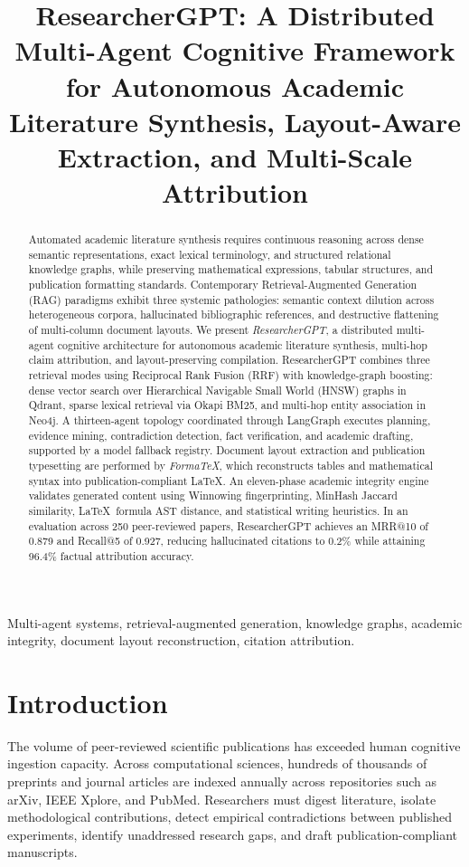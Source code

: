 \documentclass[conference]{IEEEtran}
\title{ResearcherGPT: A Distributed Multi-Agent Cognitive Framework for Autonomous Academic Literature Synthesis, Layout-Aware Extraction, and Multi-Scale Attribution}
\author{
\IEEEauthorblockN{Archit Gupta}
\IEEEauthorblockA{\textit{Department of Artificial Intelligence and Data Science} \\
\textit{Independent Researcher} \\
architag1503@gmail.com}
\and
\IEEEauthorblockN{Tanishq Sharma}
\IEEEauthorblockA{\textit{Department of Artificial Intelligence and Data Science} \\
\textit{Independent Researcher} \\
tanishq2228@gmail.com}
}
\begin{document}
\maketitle

\begin{abstract}
Automated academic literature synthesis requires continuous reasoning across dense semantic representations, exact lexical terminology, and structured relational knowledge graphs, while preserving mathematical expressions, tabular structures, and publication formatting standards. Contemporary Retrieval-Augmented Generation (RAG) paradigms exhibit three systemic pathologies: semantic context dilution across heterogeneous corpora, hallucinated bibliographic references, and destructive flattening of multi-column document layouts. We present \textit{ResearcherGPT}, a distributed multi-agent cognitive architecture for autonomous academic literature synthesis, multi-hop claim attribution, and layout-preserving compilation. ResearcherGPT combines three retrieval modes using Reciprocal Rank Fusion (RRF) with knowledge-graph boosting: dense vector search over Hierarchical Navigable Small World (HNSW) graphs in Qdrant, sparse lexical retrieval via Okapi BM25, and multi-hop entity association in Neo4j. A thirteen-agent topology coordinated through LangGraph executes planning, evidence mining, contradiction detection, fact verification, and academic drafting, supported by a model fallback registry. Document layout extraction and publication typesetting are performed by \textit{FormaTeX}, which reconstructs tables and mathematical syntax into publication-compliant \LaTeX. An eleven-phase academic integrity engine validates generated content using Winnowing fingerprinting, MinHash Jaccard similarity, \LaTeX\ formula AST distance, and statistical writing heuristics. In an evaluation across 250 peer-reviewed papers, ResearcherGPT achieves an MRR@10 of 0.879 and Recall@5 of 0.927, reducing hallucinated citations to 0.2\% while attaining 96.4\% factual attribution accuracy.
\end{abstract}

\begin{IEEEkeywords}
Multi-agent systems, retrieval-augmented generation, knowledge graphs, academic integrity, document layout reconstruction, citation attribution.
\end{IEEEkeywords}

\section{Introduction}
The volume of peer-reviewed scientific publications has exceeded human cognitive ingestion capacity. Across computational sciences, hundreds of thousands of preprints and journal articles are indexed annually across repositories such as arXiv, IEEE Xplore, and PubMed. Researchers must digest literature, isolate methodological contributions, detect empirical contradictions between published experiments, identify unaddressed research gaps, and draft publication-compliant manuscripts.
\end{document}
